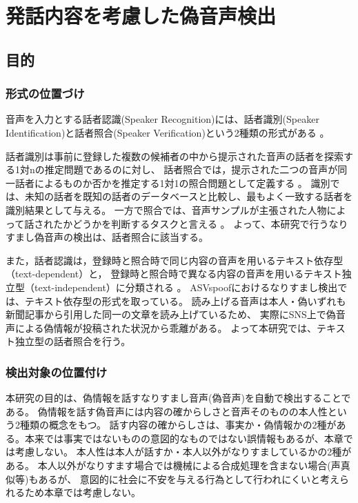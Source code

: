 \chapter{発話内容を考慮した偽音声検出}\label{ch:spc_cnt}
\section{目的}\label{sec:cnt_pur}
\subsection{形式の位置づけ}
音声を入力とする話者認識(Speaker Recognition)には、話者識別(Speaker Identification)と話者照合(Speaker Verification)という2種類の形式がある \cite{FURUI1997859,628714,5745552}。

話者識別は事前に登録した複数の候補者の中から提示された音声の話者を探索する1対nの推定問題であるのに対し、
話者照合では，提示された二つの音声が同一話者によるものか否かを推定する1対1の照合問題として定義する \cite{俵直弘2022}。
識別では、未知の話者を既知の話者のデータベースと比較し、最もよく一致する話者を識別結果として与える。
一方で照合では、音声サンプルが主張された人物によって話されたかどうかを判断するタスクと言える \cite{1561284}。
よって、本研究で行うなりすまし偽音声の検出は、話者照合に該当する。

また，話者認識は，登録時と照合時で同じ内容の音声を用いるテキスト依存型（text-dependent）と，
登録時と照合時で異なる内容の音声を用いるテキスト独立型（text-independent）に分類される \cite{俵直弘2022}。
ASVspoofにおけるなりすまし検出では、テキスト依存型の形式を取っている。
読み上げる音声は本人・偽いずれも新聞記事から引用した同一の文章を読み上げているため、
実際にSNS上で偽音声による偽情報が投稿された状況から乖離がある。
よって本研究では、テキスト独立型の話者照合を行う。

\subsection{検出対象の位置付け}
本研究の目的は、偽情報を話すなりすまし音声(偽音声)を自動で検出することである。
偽情報を話す偽音声には内容の確からしさと音声そのものの本人性という2種類の概念をもつ。
話す内容の確からしさは、事実か・偽情報かの2種がある。本来では事実ではないものの意図的なものではない誤情報もあるが、本章では考慮しない。
本人性は本人が話すか・本人以外がなりすましているかの2種がある。
本人以外がなりすます場合では機械による合成処理を含まない場合(声真似等)もあるが、
意図的に社会に不安を与える行為として行われにくいと考えられるため本章では考慮しない。

